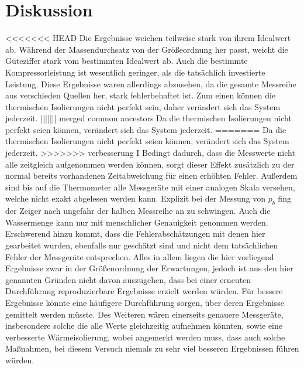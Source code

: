 \section{Diskussion}
\label{sec:Diskussion}
<<<<<<< HEAD
Die Ergebnisse weichen teilweise stark von ihrem Idealwert ab. Während der Massendurchsatz von der Größeordnung her passt, weicht die Güteziffer stark vom bestimmten Idealwert ab.
Auch die bestimmte Kompressorleistung ist wesentlich geringer, als die tatsächlich investierte Leistung.
Diese Ergebnisse waren allerdings abzusehen, da die gesamte Messreihe aus verschieden Quellen her, stark fehlerbehaftet ist.
Zum einen können die thermischen Isolierungen nicht perfekt sein, daher verändert sich das System jederzeit.
||||||| merged common ancestors
Da die thermischen Isolierungen nicht perfekt seien können, verändert sich das System jederzeit.
=======
Da die thermischen Isolierungen nicht perfekt seien können, verändert sich das System jederzeit.
>>>>>>> verbesserung I
Bedingt dadurch, dass die Messwerte nicht alle zeitgleich aufgenommen werden können, sorgt dieser Effekt zusätzlich zu der normal bereits vorhandenen Zeitabweichung für einen erhöhten Fehler.
Außerdem sind bis auf die Thermometer alle Messgeräte mit einer analogen Skala versehen, welche nicht exakt abgelesen werden kann. Explizit bei der Messung von $p_b$ fing der Zeiger nach ungefähr der halben Messreihe an zu schwingen.
Auch die Wassermenge kann nur mit menschlicher Genauigkeit genommen werden.
Erschwerend hinzu kommt, dass die Fehlerabschätzungen mit denen hier gearbeitet wurden, ebenfalls nur geschätzt sind und nicht dem tatsächlichen Fehler der Messgeräte entsprechen.
Alles in allem liegen die hier vorliegend Ergebnisse zwar in der Größenordnung der Erwartungen, jedoch ist aus den hier genannten Gründen nicht davon auszugehen, dass bei einer erneuten Durchführung reproduzierbare Ergebnisse erzielt werden würden.
Für bessere Ergebnisse könnte eine häufigere Durchführung sorgen, über deren Ergebnisse gemittelt werden müsste.
Des Weiteren wären einerseits genauere Messgeräte, insbesondere solche die alle Werte gleichzeitig aufnehmen könnten, sowie eine verbesserte Wärmeisolierung, 
wobei angemerkt werden muss, dass auch solche Maßnahmen, bei diesem Versuch niemals zu sehr viel besseren Ergebnissen führen würden.
